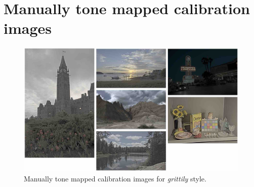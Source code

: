 \chapter{Manually tone mapped calibration images}
\label{app:calib}


\begin{figure}
\begin{center}
\includegraphics[width=\textwidth]{appendix2/calibimg_grittily_small.jpg}
\caption{Manually tone mapped calibration images for \emph{grittily} style.}
\end{center}
\end{figure}

